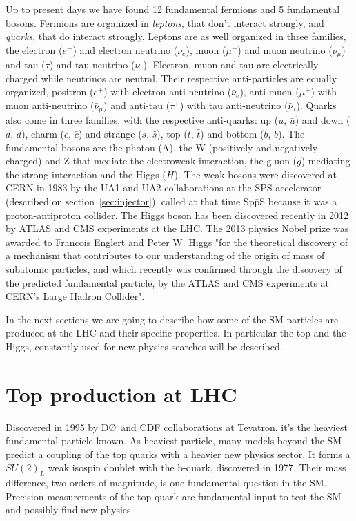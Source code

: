 Up to present days we have found 12 fundamental fermions and 5 fundamental bosons. Fermions are organized in \textit{leptons}, that don't interact strongly, and \textit{quarks}, that do interact strongly. Leptons are as well organized in three families, the electron ($e^{-}$) and electron neutrino ($\nu_{e}$), muon ($\mu^{-}$) and muon neutrino ($\nu_{\mu}$) and tau ($\tau$) and tau neutrino ($\nu_{\tau}$). Electron, muon and tau are electrically charged while neutrinos are neutral. Their respective anti-particles are equally organized, positron ($e^{+}$) with electron anti-neutrino ($\bar{\nu}_{e}$), anti-muon ($\mu^{+}$) with muon anti-neutrino ($\bar{\nu}_{\mu}$) and anti-tau ($\tau^{+}$) with tau anti-neutrino ($\bar{\nu}_{\tau}$). Quarks also come in three families, with the respective anti-quarks: up ($u$, $\bar{u}$) and down ($d$, $\bar{d}$), charm ($c$, $\bar{c}$) and strange ($s$, $\bar{s}$), top ($t$, $\bar{t}$) and bottom ($b$, $\bar{b}$). The fundamental bosons are the photon (A), the W (positively and negatively charged) and Z that mediate the electroweak interaction, the gluon ($g$) mediating the strong interaction and the Higgs ($H$). The weak bosons were discovered at CERN in 1983 by the UA1 and UA2 collaborations at the SPS accelerator (described on section~\ref{sec:injector}), called at that time Sp$\bar{\text{p}}$S because it was a proton-antiproton collider. The Higgs boson has been discovered recently in 2012 by ATLAS and CMS experiments at the LHC. The 2013 physics Nobel prize was awarded to Francois Englert and Peter W. Higgs "for the theoretical discovery of a mechanism that contributes to our understanding of the origin of mass of subatomic particles, and which recently was confirmed through the discovery of the predicted fundamental particle, by the ATLAS and CMS experiments at CERN's Large Hadron Collider".

In the next sections we are going to describe how some of the SM particles are produced at the LHC and their specific properties. In particular the top and the Higgs, constantly used for new physics searches will be described.

\section{Top production at LHC}

Discovered in 1995 by D\O~and CDF collaborations at Tevatron, it's the heaviest fundamental particle known. As heaviest particle, many models beyond the SM predict a coupling of the top quarks with a heavier new physics sector. It forms a $SU(2)_{L}$ weak isospin doublet with the b-quark, discovered in 1977. Their mass difference, two orders of magnitude, is one fundamental question in the SM. Precision measurements of the top quark are fundamental input to test the SM and possibly find new physics.

